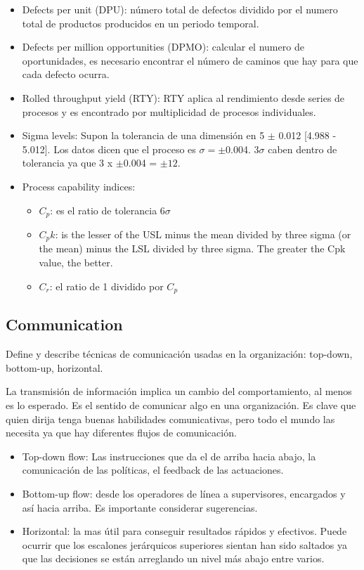 \documentclass[]{article}
\begin{document}
\begin{itemize}
	\item Defects per unit (DPU): número total de defectos dividido por el numero total de productos producidos en un periodo temporal.
	\item Defects per million opportunities (DPMO): calcular el numero de oportunidades, es necesario encontrar el número de caminos que hay para que cada defecto ocurra.
	\item Rolled throughput yield (RTY): RTY aplica al rendimiento desde series de procesos y es encontrado por multiplicidad de procesos individuales.
	\item Sigma levels: Supon la tolerancia de una dimensión en 5 $\pm$ 0.012 [4.988 - 5.012]. Los datos dicen que el proceso es $\sigma = \pm$0.004. 3$\sigma$ caben dentro de tolerancia ya que 3 x $\pm$0.004 = $\pm 12$.
	\item Process capability indices:
	\begin{itemize}
		\item $C_p$: es el ratio de tolerancia $6\sigma$ 
		\item $C_pk$: is the lesser of the USL minus the mean divided by three sigma (or the mean) minus the LSL divided by three sigma. The greater the Cpk value, the better.
		\item $C_r$: el ratio de 1 dividido por $C_p$
	\end{itemize}
\end{itemize}

\subsection{Communication}

Define y describe técnicas de comunicación usadas en la organización: top-down, bottom-up, horizontal.

La transmisión de información implica un cambio del comportamiento, al menos es lo esperado. Es el sentido de comunicar algo en una organización. Es clave que quien dirija tenga buenas habilidades comunicativas, pero todo el mundo las necesita ya que hay diferentes flujos de comunicación.

\begin{itemize}
	\item Top-down flow: Las instrucciones que da el de arriba hacia abajo, la comunicación de las políticas, el feedback de las actuaciones.
	\item Bottom-up flow: desde los operadores de línea a supervisores, encargados y así hacia arriba. Es importante considerar sugerencias.
	\item Horizontal: la mas útil para conseguir resultados rápidos y efectivos. Puede ocurrir que los escalones jerárquicos superiores sientan han sido saltados ya que las decisiones se están arreglando un nivel más abajo entre varios.
\end{itemize}
\end{document}
